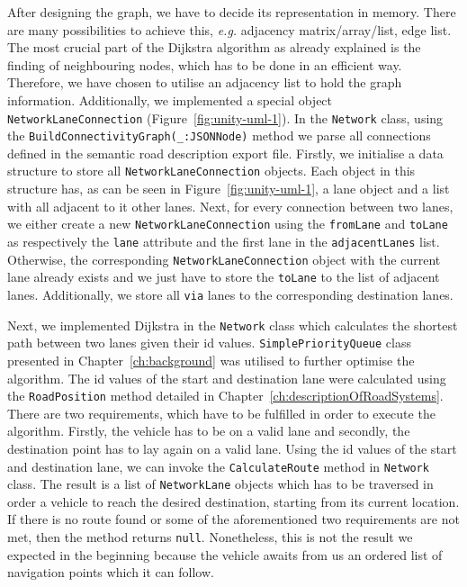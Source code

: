 After designing the graph, we have to decide its representation in memory. There are many possibilities to achieve this, \emph{e.g.} adjacency matrix/array/list, edge list. The most crucial part of the Dijkstra algorithm as already explained is the finding of neighbouring nodes, which has to be done in an efficient way. Therefore, we have chosen to utilise an adjacency list to hold the graph information. Additionally, we implemented a special object \texttt{NetworkLaneConnection} (Figure~\ref{fig:unity-uml-1}). In the \texttt{Network} class, using the \texttt{BuildConnectivityGraph(\_:\;JSONNode)} method we parse all connections defined in the semantic road description export file. Firstly, we initialise a data structure to store all \texttt{NetworkLaneConnection} objects. Each object in this structure has, as can be seen in Figure~\ref{fig:unity-uml-1}, a lane object and a list with all adjacent to it other lanes. Next, for every connection between two lanes, we either create a new \texttt{NetworkLaneConnection} using the \texttt{fromLane} and \texttt{toLane} as respectively the \texttt{lane} attribute and the first lane in the \texttt{adjacentLanes} list. Otherwise, the corresponding \texttt{NetworkLaneConnection} object with the current lane already exists and we just have to store the \texttt{toLane} to the list of adjacent lanes. Additionally, we store all \texttt{via} lanes to the corresponding destination lanes.

Next, we implemented Dijkstra in the \texttt{Network} class which calculates the shortest path between two lanes given their id values. \texttt{SimplePriorityQueue} class presented in Chapter~\ref{ch:background} was utilised to further optimise the algorithm. The id values of the start and destination lane were calculated using the \texttt{RoadPosition} method detailed in Chapter~\ref{ch:descriptionOfRoadSystems}. There are two requirements, which have to be fulfilled in order to execute the algorithm. Firstly, the vehicle has to be on a valid lane and secondly, the destination point has to lay again on a valid lane. Using the id values of the start and destination lane, we can invoke the \texttt{CalculateRoute} method in \texttt{Network} class. The result is a list of \texttt{NetworkLane} objects which has to be traversed in order a vehicle to reach the desired destination, starting from its current location. If there is no route found or some of the aforementioned two requirements are not met, then the method returns \texttt{null}. Nonetheless, this is not the result we expected in the beginning because the vehicle awaits from us an ordered list of navigation points which it can follow.\\

